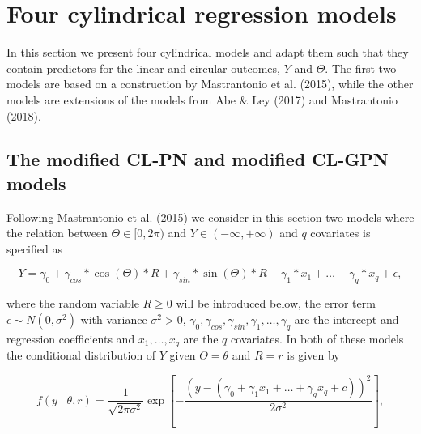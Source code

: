 \documentclass[12pt,]{article}
\begin{document}
\section{Four cylindrical regression models}\label{Models}

In this section we present four cylindrical models and adapt them such
that they contain predictors for the linear and circular outcomes, \(Y\)
and \(\Theta\). The first two models are based on a construction by
Mastrantonio et al. (2015), while the other models are extensions of the
models from Abe \& Ley (2017) and Mastrantonio (2018).

\subsection{The modified CL-PN and modified CL-GPN  models}\label{CL-(G)PN}

Following Mastrantonio et al. (2015) we consider in this section two
models where the relation between \(\Theta \in [0, 2\pi)\) and
\(Y\in (-\infty, + \infty)\) and \(q\) covariates is specified as

\begin{equation}\label{circlinlink}
Y = \gamma_0 + \gamma_{cos}*\cos(\Theta)*R + \gamma_{sin}*\sin(\Theta)*R + \gamma_1*x_1 + \dots + \gamma_q*x_q +  \epsilon,
\end{equation}

\noindent where the random variable \(R\geq0\) will be introduced below,
the error term \(\epsilon \sim N(0, \sigma^2)\) with variance
\(\sigma^2>0\),
\(\gamma_0, \gamma_{cos}, \gamma_{sin}, \gamma_1, \dots, \gamma_q\) are
the intercept and regression coefficients and \(x_1, \dots, x_q\) are
the \(q\) covariates. In both of these models the conditional
distribution of \(Y\) given \(\Theta=\theta\) and \(R = r\) is given by

\begin{equation}\label{ycondtheta}
f(y \mid \theta, r) = \frac{1}{\sqrt{2\pi\sigma^2}}\exp\left[-\frac{(y - (\gamma_0 + \gamma_1x_1 + \dots + \gamma_qx_q+c))^{2}}{2\sigma^2}\right],\nonumber
\end{equation}
\end{document}
